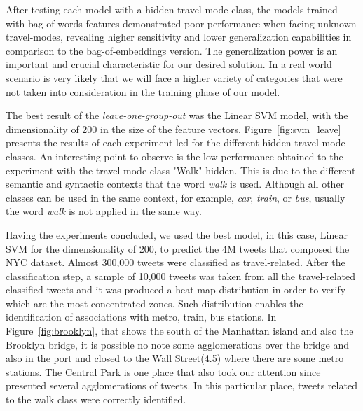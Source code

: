 After testing each model with a hidden travel-mode class, the models trained with bag-of-words features demonstrated poor performance when facing unknown travel-modes, revealing higher sensitivity and lower generalization capabilities in comparison to the bag-of-embeddings version. The generalization power is an important and crucial characteristic for our desired solution. In a real world scenario is very likely that we will face a higher variety of categories that were not taken into consideration in the training phase of our model.

\begin{table}[htbp]
	\centering
	\small
	\caption{Sample of tweet messages correctly classified}
	\label{tab:tweets_examples}
\end{table}

The best result of the \emph{leave-one-group-out} was the Linear SVM model, with the dimensionality of 200 in the size of the feature vectors. Figure~\ref{fig:svm_leave} presents the results of each experiment led for the different hidden travel-mode classes. An interesting point to observe is the low performance obtained to the experiment with the travel-mode class "Walk" hidden. This is due to the different semantic and syntactic contexts that the word \emph{walk} is used. Although all other classes can be used in the same context, for example, \emph{car}, \emph{train}, or \emph{bus}, usually the word \emph{walk} is not applied in the same way.

Having the experiments concluded, we used the best model, in this case, Linear SVM for the dimensionality of 200, to predict the 4M tweets that composed the NYC dataset. Almost 300,000 tweets were classified as travel-related. After the classification step, a sample of 10,000 tweets was taken from all the travel-related classified tweets and it was produced a heat-map distribution in order to verify which are the most concentrated zones. Such distribution enables the identification of associations with metro, train, bus stations. In Figure~\ref{fig:brooklyn}, that shows the south of the Manhattan island and also the Brooklyn bridge, it is possible no note some agglomerations over the bridge and also in the port and closed to the Wall Street(4.5) where there are some metro stations. The Central Park is one place that also took our attention since presented several agglomerations of tweets. In this particular place, tweets related to the walk class were correctly identified.

